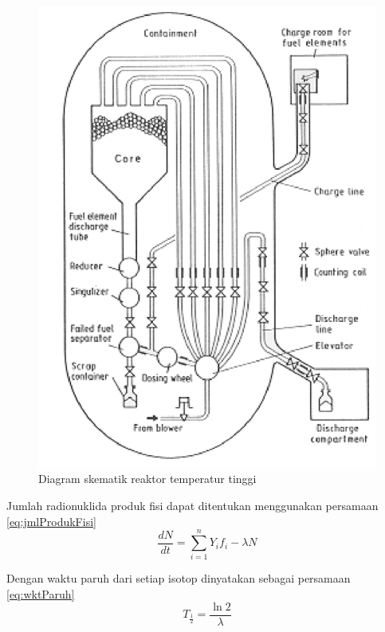 \documentclass[a4paper,11pt]{report}
\begin{document}
\begin{figure}[h!]
  \begin{center}
    \includegraphics[scale=.25]{pics/htrSchematic.png}
    \caption{Diagram skematik reaktor temperatur tinggi \cite{kadak}}
    \label{fig:reaktorHTRskematik}
  \end{center}
\end{figure}

Jumlah radionuklida produk fisi dapat ditentukan menggunakan persamaan \ref{eq:jmlProdukFisi} \cite{report2}
\begin{equation}
\frac{dN}{dt}=\sum\limits_{i=1}^{n}Y_if_i - \lambda N
\label{eq:jmlProdukFisi}
\end{equation}

Dengan waktu paruh dari setiap isotop dinyatakan sebagai persamaan \ref{eq:wktParuh}
\begin{equation}
  T_{\frac{1}{2}}=\frac{\ln 2}{\lambda}
  \label{eq:wktParuh}
\end{equation}
\end{document}
